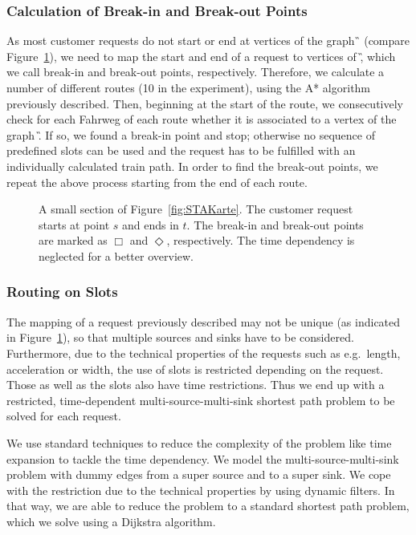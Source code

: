 \subsubsection{Calculation of Break-in and Break-out Points}
%
As most customer requests do not start or end at vertices of the graph \G\, (compare Figure~\ref{fig:E-A-Pkte}), we need to map the start and end of a request to vertices of \G, which we call break-in and break-out points, respectively. Therefore, we calculate a number of different routes (10 in the experiment), using the A* algorithm previously described. Then, beginning at the start of the route, we consecutively check for each Fahrweg of each route whether it is associated to a vertex of the graph \G. If so, we found a break-in point and stop; otherwise no sequence of predefined slots can be used and the request has to be fulfilled with an individually calculated train path. In order to find the break-out points, we repeat the above process starting from the end of each route.
%
\begin{figure}[tb]
	\centering
	\caption{A small section of Figure~\ref{fig:STAKarte}. The customer request starts at point $s$ and ends in $t$. The break-in and break-out points are marked as $\Box$ and $\Diamond$, respectively. The time dependency is neglected for a better overview.}
	\label{fig:E-A-Pkte}
\end{figure}

\subsubsection{Routing on Slots}
The mapping of a request previously described may not be unique (as indicated in Figure~\ref{fig:E-A-Pkte}), so that multiple sources and sinks have to be considered. Furthermore, due to the technical properties of the requests such as e.g.\ length, acceleration or width, the use of slots is restricted depending on the request. Those as well as the slots also have time restrictions. Thus we end up with a restricted, time-dependent multi-source-multi-sink shortest path problem to be solved for each request.

We use standard techniques to reduce the complexity of the problem like time expansion to tackle the time dependency. We model the multi-source-multi-sink problem with dummy edges from a super source and to a super sink. We cope with the restriction due to the technical properties by using dynamic filters. In that way, we are able to reduce the problem to a standard shortest path problem, which we solve using a Dijkstra algorithm.

